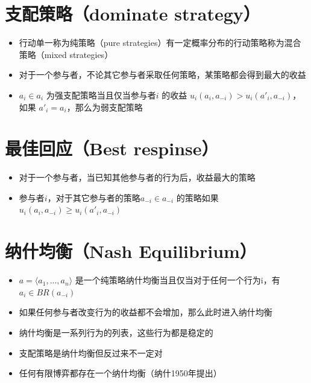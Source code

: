 \documentclass[
]{book}
\providecommand{\tightlist}{%
  \setlength{\itemsep}{0pt}\setlength{\parskip}{0pt}}
\begin{document}
\hypertarget{ux652fux914dux7b56ux7565dominate-strategy}{%
\section{支配策略（dominate strategy）}\label{ux652fux914dux7b56ux7565dominate-strategy}}

\begin{itemize}
\tightlist
\item
  行动单一称为纯策略（pure strategies）有一定概率分布的行动策略称为混合策略（mixed strategies）
\item
  对于一个参与者，不论其它参与者采取任何策略，某策略都会得到最大的收益
\item
  \(a_i \in a_i\) 为强支配策略当且仅当参与者\(i\) 的收益 \(u_i(a_i,a_{-i}) > u_i(a'_i,a_{-i})\)，如果 \(a'_i = a_i\)，那么为弱支配策略
\end{itemize}

\hypertarget{ux6700ux4f73ux56deux5e94best-respinse}{%
\section{最佳回应（Best respinse）}\label{ux6700ux4f73ux56deux5e94best-respinse}}

\begin{itemize}
\tightlist
\item
  对于一个参与者，当已知其他参与者的行为后，收益最大的策略
\item
  参与者\(i\)，对于其它参与者的策略\(a_{-i} \in a_{-i}\) 的策略如果\(u_i(a_i,a_{-i}) \geqslant u_i(a'_i,a_{-i})\)
\end{itemize}

\hypertarget{ux7eb3ux4ec0ux5747ux8861nash-equilibrium}{%
\section{纳什均衡（Nash Equilibrium）}\label{ux7eb3ux4ec0ux5747ux8861nash-equilibrium}}

\begin{itemize}
\tightlist
\item
  \(a = \langle a_1,...,a_n\rangle\) 是一个纯策略纳什均衡当且仅当对于任何一个行为i，有\(a_i \in BR(a_{-i})\)
\item
  如果任何参与者改变行为的收益都不会增加，那么此时进入纳什均衡
\item
  纳什均衡是一系列行为的列表，这些行为都是稳定的
\item
  支配策略是纳什均衡但反过来不一定对
\item
  任何有限博弈都存在一个纳什均衡（纳什1950年提出）
\end{itemize}
\end{document}
